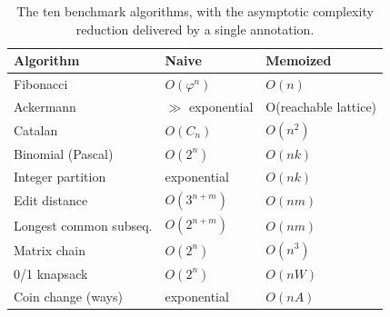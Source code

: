\begin{table}[t]
\caption{The ten benchmark algorithms, with the asymptotic complexity reduction delivered by a single  annotation.}
\label{tab:algorithms}
\small
\centering
\begin{tabularx}{\columnwidth}{@{}l l l@{}}
\toprule
\textbf{Algorithm} & \textbf{Naive} & \textbf{Memoized} \\
\midrule
Fibonacci                 & $O(\varphi^n)$          & $O(n)$ \\
Ackermann                 & $\gg$ exponential       & O(reachable lattice) \\
Catalan                   & $O(C_n)$                & $O(n^2)$ \\
Binomial (Pascal)         & $O(2^n)$                & $O(n k)$ \\
Integer partition         & exponential             & $O(n k)$ \\
Edit distance             & $O(3^{n+m})$            & $O(n m)$ \\
Longest common subseq.    & $O(2^{n+m})$            & $O(n m)$ \\
Matrix chain              & $O(2^n)$                & $O(n^3)$ \\
0/1 knapsack              & $O(2^n)$                & $O(n W)$ \\
Coin change (ways)        & exponential             & $O(n A)$ \\
\bottomrule
\end{tabularx}
\end{table}
